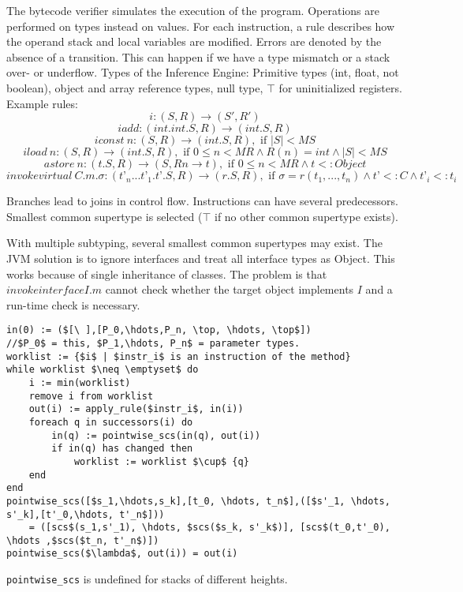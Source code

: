 \begin{mytitle} The bytecode verifier simulates the execution of the program. Operations are performed on types instead on values. For each instruction, a rule describes how the operand stack and local variables are modified. Errors are denoted by the absence of a transition. This can happen if we have a type mismatch or a stack over- or underflow. Types of the Inference Engine: Primitive types (int, float, not boolean), object and array reference types, null type, $\top$ for uninitialized registers. Example rules: 
    $$i:(S,R) \to (S',R')$$
    $$iadd:(int.int.S,R) \to (int.S,R)$$
    $$iconst\ n:( S,R ) \to ( int.S,R ), \text{ if }|S| < MS$$
    $$iload\ n:( S,R ) \to ( int.S,R ),\text{ if }0 \le n < MR \land R( n ) = int \land |S| < MS $$
    $$astore\ n:( t.S,R ) \to ( S,R{ n \to t } ),\text{ if }0 \le n < MR \land t <: Object$$
    $$invokevirtual\ C.m.\sigma:( t’_n...t’_1.t’.S,R ) \to ( r.S,R ),\text{ if }\sigma=r(t_1,...,t_n)\land t’<:C\land t’_i <:t_i$$
\end{mytitle}
\begin{mytitle} Branches lead to joins in control flow. Instructions can have several predecessors. Smallest common supertype is selected ($\top$ if no other common supertype exists).
\end{mytitle}
\begin{mytitle} With multiple subtyping, several smallest common supertypes may exist. The JVM solution is to ignore interfaces and treat all interface types as Object. This works because of single inheritance of classes. The problem is that $invokeinterface I.m$ cannot check whether the target object implements $I$ and a run-time check is necessary.
\end{mytitle}
\begin{mytitle}\hfill
\lstset{language=pseudo}
\begin{lstlisting}[mathescape=true]
in(0) := ($[\ ],[P_0,\hdots,P_n, \top, \hdots, \top$])
//$P_0$ = this, $P_1,\hdots, P_n$ = parameter types. 
worklist := {$i$ | $instr_i$ is an instruction of the method}
while worklist $\neq \emptyset$ do
    i := min(worklist)
    remove i from worklist
    out(i) := apply_rule($instr_i$, in(i))
    foreach q in successors(i) do
        in(q) := pointwise_scs(in(q), out(i))
        if in(q) has changed then 
            worklist := worklist $\cup$ {q}
    end
end
pointwise_scs([$s_1,\hdots,s_k],[t_0, \hdots, t_n$],([$s'_1, \hdots, s'_k],[t'_0,\hdots, t'_n$]))
    = ([scs$(s_1,s'_1), \hdots, $scs($s_k, s'_k$)], [scs$(t_0,t'_0), \hdots ,$scs($t_n, t'_n$)])
pointwise_scs($\lambda$, out(i)) = out(i)
\end{lstlisting}
\texttt{pointwise\_scs} is undefined for stacks of different heights.
\end{mytitle}
